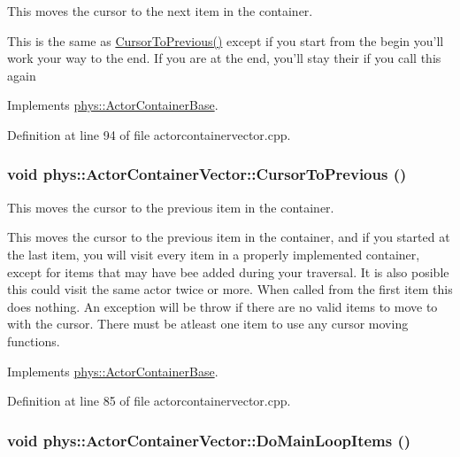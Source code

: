 This moves the cursor to the next item in the container. 

This is the same as \hyperlink{classphys_1_1ActorContainerVector_ac483bcdf348f55dc8b04a8805a002413}{CursorToPrevious()} except if you start from the begin you'll work your way to the end. If you are at the end, you'll stay their if you call this again 

Implements \hyperlink{classphys_1_1ActorContainerBase_a1aa337456a4e74cb5740dbae08778072}{phys::ActorContainerBase}.



Definition at line 94 of file actorcontainervector.cpp.

\hypertarget{classphys_1_1ActorContainerVector_ac483bcdf348f55dc8b04a8805a002413}{
\subsubsection[{CursorToPrevious}]{\setlength{\rightskip}{0pt plus 5cm}void phys::ActorContainerVector::CursorToPrevious ()}}
\label{d3/d64/classphys_1_1ActorContainerVector_ac483bcdf348f55dc8b04a8805a002413}


This moves the cursor to the previous item in the container. 

This moves the cursor to the previous item in the container, and if you started at the last item, you will visit every item in a properly implemented container, except for items that may have bee added during your traversal. It is also posible this could visit the same actor twice or more. When called from the first item this does nothing. An exception will be throw if there are no valid items to move to with the cursor. There must be atleast one item to use any cursor moving functions. 

Implements \hyperlink{classphys_1_1ActorContainerBase_a7c424168c0bbd973b283a083714123b3}{phys::ActorContainerBase}.



Definition at line 85 of file actorcontainervector.cpp.

\hypertarget{classphys_1_1ActorContainerVector_a883e59ac1674421bac143088a6cf07c8}{
\subsubsection[{DoMainLoopItems}]{\setlength{\rightskip}{0pt plus 5cm}void phys::ActorContainerVector::DoMainLoopItems ()}}
\label{d3/d64/classphys_1_1ActorContainerVector_a883e59ac1674421bac143088a6cf07c8}


